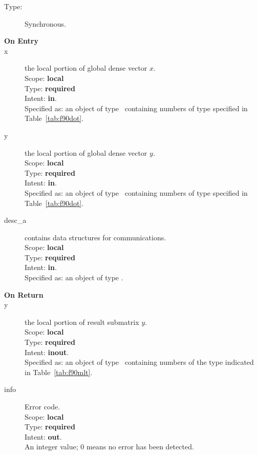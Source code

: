 \begin{description}
	\item[Type:] Synchronous.
	\item[\bf On Entry]
	\item[x] the local portion of global dense vector
	$x$.\\
	Scope: {\bf local} \\
	Type: {\bf required} \\
	Intent: {\bf in}.\\
	Specified as:  an object of type \vdata\
	containing numbers of type specified in
	Table~\ref{tab:f90dot}.
	\item[y] the local portion of global dense vector
	$y$. \\
	Scope: {\bf local} \\
	Type: {\bf required} \\
	Intent: {\bf in}.\\
	Specified as:  an object of type \vdata\
	containing numbers of type specified in
	Table~\ref{tab:f90dot}.
	\item[desc\_a] contains data structures for communications.\\
	Scope: {\bf local} \\
	Type: {\bf required}\\
	Intent: {\bf in}.\\
	Specified as: an object of type \descdata.
	\item[\bf On Return]
	\item[y] the local portion of result submatrix $y$.\\
	Scope: {\bf local} \\
	Type: {\bf required} \\
	Intent: {\bf inout}.\\
	Specified as: an object of type \vdata\ containing numbers of the type
	indicated in Table~\ref{tab:f90mlt}.
	\item[info] Error code.\\
	Scope: {\bf local} \\
	Type: {\bf required} \\
	Intent: {\bf out}.\\
	An integer value; 0 means no error has been detected.
\end{description}

